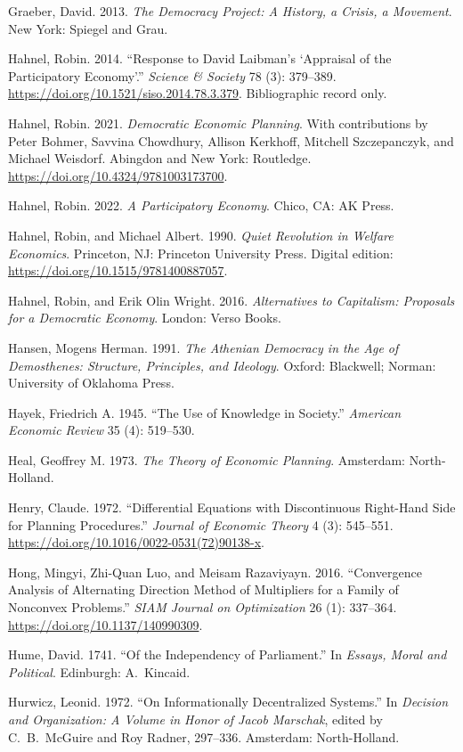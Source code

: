 \documentclass[10pt,twoside,openany]{book}
\theoremstyle{dpepstyle}
\begin{document}
\begin{list}{}{\setlength{\leftmargin}{1.8em}\setlength{\itemindent}{-1.8em}\setlength{\itemsep}{3pt}\setlength{\parsep}{0pt}}
\item Graeber, David. 2013. \emph{The Democracy Project: A History, a Crisis, a Movement}. New York: Spiegel and Grau.
\item Hahnel, Robin. 2014. ``Response to David Laibman's `Appraisal of the Participatory Economy'.'' \emph{Science \& Society} 78 (3): 379--389. \url{https://doi.org/10.1521/siso.2014.78.3.379}. Bibliographic record only.
\item Hahnel, Robin. 2021. \emph{Democratic Economic Planning}. With contributions by Peter Bohmer, Savvina Chowdhury, Allison Kerkhoff, Mitchell Szczepanczyk, and Michael Weisdorf. Abingdon and New York: Routledge. \url{https://doi.org/10.4324/9781003173700}.
\item Hahnel, Robin. 2022. \emph{A Participatory Economy}. Chico, CA: AK Press.
\item Hahnel, Robin, and Michael Albert. 1990. \emph{Quiet Revolution in Welfare Economics}. Princeton, NJ: Princeton University Press. Digital edition: \url{https://doi.org/10.1515/9781400887057}.
\item Hahnel, Robin, and Erik Olin Wright. 2016. \emph{Alternatives to Capitalism: Proposals for a Democratic Economy}. London: Verso Books.
\item Hansen, Mogens Herman. 1991. \emph{The Athenian Democracy in the Age of Demosthenes: Structure, Principles, and Ideology}. Oxford: Blackwell; Norman: University of Oklahoma Press.
\item Hayek, Friedrich A. 1945. ``The Use of Knowledge in Society.'' \emph{American Economic Review} 35 (4): 519--530.
\item Heal, Geoffrey M. 1973. \emph{The Theory of Economic Planning}. Amsterdam: North-Holland.
\item Henry, Claude. 1972. ``Differential Equations with Discontinuous Right-Hand Side for Planning Procedures.'' \emph{Journal of Economic Theory} 4 (3): 545--551. \url{https://doi.org/10.1016/0022-0531(72)90138-x}.
\item Hong, Mingyi, Zhi-Quan Luo, and Meisam Razaviyayn. 2016. ``Convergence Analysis of Alternating Direction Method of Multipliers for a Family of Nonconvex Problems.'' \emph{SIAM Journal on Optimization} 26 (1): 337--364. \url{https://doi.org/10.1137/140990309}.
\item Hume, David. 1741. ``Of the Independency of Parliament.'' In \emph{Essays, Moral and Political}. Edinburgh: A.\ Kincaid.
\item Hurwicz, Leonid. 1972. ``On Informationally Decentralized Systems.'' In \emph{Decision and Organization: A Volume in Honor of Jacob Marschak}, edited by C.~B.\ McGuire and Roy Radner, 297--336. Amsterdam: North-Holland.

\end{list}
\end{document}
